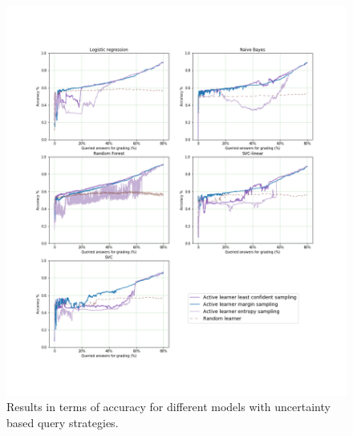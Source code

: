 	\begin{figure}[!htb]
		\centering
		\includegraphics[scale=0.45]{images/task1_accuracy_uncertainty}
		\caption{Results in terms of accuracy for different models with uncertainty based query strategies.}
		\label{t1_m_uncertainty}
	\end{figure}
	
